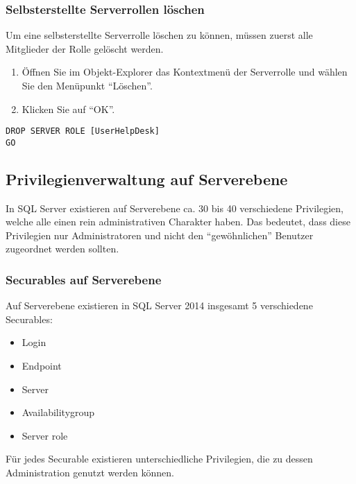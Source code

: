         \subsubsection{Selbsterstellte Serverrollen löschen}
          Um eine selbsterstellte Serverrolle löschen zu können, müssen zuerst
          alle Mitglieder der Rolle gelöscht werden.
          \begin{enumerate}
            \item Öffnen Sie im Objekt-Explorer das Kontextmenü der Serverrolle
            und wählen Sie den Menüpunkt \enquote{Löschen}.
            \item Klicken Sie auf \enquote{OK}.
          \end{enumerate}
          \begin{lstlisting}[language=ms_sql,caption={Entfernen einer
          Serverrolle},label=sql19_05a]
DROP SERVER ROLE [UserHelpDesk]
GO
          \end{lstlisting}
          \begin{literaturinternet}
            \item \cite{ee677643}
          \end{literaturinternet}
      \subsection{Privilegienverwaltung auf Serverebene}
        In SQL Server existieren auf Serverebene ca. 30 bis 40 verschiedene
        Privilegien, welche alle einen rein administrativen Charakter haben. Das
        bedeutet, dass diese Privilegien nur Administratoren und nicht den
        \enquote{gewöhnlichen} Benutzer zugeordnet werden sollten.
        \subsubsection{Securables auf Serverebene}
          Auf Serverebene existieren in SQL Server 2014 insgesamt 5 verschiedene
          Securables:
          \begin{itemize}
            \item Login
            \item Endpoint
            \item Server
            \item Availabilitygroup
            \item Server role
          \end{itemize}
          Für jedes Securable existieren unterschiedliche Privilegien, die zu
          dessen Administration genutzt werden können.
